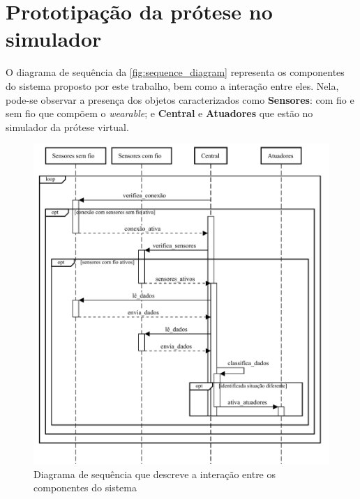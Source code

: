 \section{Prototipação da prótese no simulador}\label{sec:metodo_prototipacao}

O diagrama de sequência da \autoref{fig:sequence_diagram} representa os componentes do sistema proposto por este trabalho, bem como a interação entre eles. Nela, pode-se observar a presença dos objetos caracterizados como \textbf{Sensores}: com fio e sem fio que compõem o \textit{wearable}; e \textbf{Central} e \textbf{Atuadores} que estão no simulador da prótese virtual. 

\begin{figure}[ht]
	\caption{\label{fig:sequence_diagram}Diagrama de sequência que descreve a interação entre os componentes do sistema}
	\begin{center}
	    \includegraphics[width=\textwidth]{resources/sequence_diagram.pdf}
	\end{center}
\end{figure}

